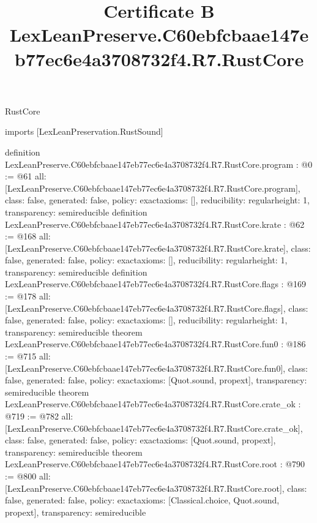 \begin{lexlean}{RustCore}
\title{Certificate B LexLeanPreserve.C60ebfcbaae147eb77ec6e4a3708732f4.R7.RustCore}
\begin{coremodule}
imports [LexLeanPreservation.RustSound]

definition LexLeanPreserve.C60ebfcbaae147eb77ec6e4a3708732f4.R7.RustCore.program : @0 := @61 {
  all: [LexLeanPreserve.C60ebfcbaae147eb77ec6e4a3708732f4.R7.RustCore.program],
  class: false,
  generated: false,
  policy: exact{axioms: []},
  reducibility: regular{height: 1},
  transparency: semireducible
}
definition LexLeanPreserve.C60ebfcbaae147eb77ec6e4a3708732f4.R7.RustCore.krate : @62 := @168 {
  all: [LexLeanPreserve.C60ebfcbaae147eb77ec6e4a3708732f4.R7.RustCore.krate],
  class: false,
  generated: false,
  policy: exact{axioms: []},
  reducibility: regular{height: 1},
  transparency: semireducible
}
definition LexLeanPreserve.C60ebfcbaae147eb77ec6e4a3708732f4.R7.RustCore.flags : @169 := @178 {
  all: [LexLeanPreserve.C60ebfcbaae147eb77ec6e4a3708732f4.R7.RustCore.flags],
  class: false,
  generated: false,
  policy: exact{axioms: []},
  reducibility: regular{height: 1},
  transparency: semireducible
}
theorem LexLeanPreserve.C60ebfcbaae147eb77ec6e4a3708732f4.R7.RustCore.fun0 : @186 := @715 {
  all: [LexLeanPreserve.C60ebfcbaae147eb77ec6e4a3708732f4.R7.RustCore.fun0],
  class: false,
  generated: false,
  policy: exact{axioms: [Quot.sound, propext]},
  transparency: semireducible
}
theorem LexLeanPreserve.C60ebfcbaae147eb77ec6e4a3708732f4.R7.RustCore.crate_ok : @719 := @782 {
  all: [LexLeanPreserve.C60ebfcbaae147eb77ec6e4a3708732f4.R7.RustCore.crate_ok],
  class: false,
  generated: false,
  policy: exact{axioms: [Quot.sound, propext]},
  transparency: semireducible
}
theorem LexLeanPreserve.C60ebfcbaae147eb77ec6e4a3708732f4.R7.RustCore.root : @790 := @800 {
  all: [LexLeanPreserve.C60ebfcbaae147eb77ec6e4a3708732f4.R7.RustCore.root],
  class: false,
  generated: false,
  policy: exact{axioms: [Classical.choice, Quot.sound, propext]},
  transparency: semireducible
}


\end{coremodule}
\end{lexlean}

